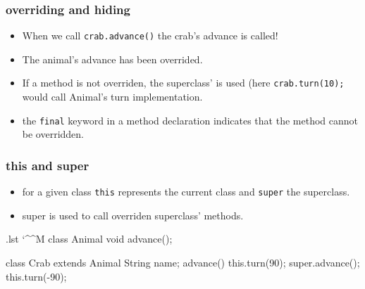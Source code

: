 \documentclass[10pt, handout]{beamer}
\makeatletter
\newenvironment{code}{%
  \begingroup
  \@bsphack
  \immediate\openout\lstvrb@out\jobname.lst
  \let\do\@makeother\dospecials\catcode`\^^M\active
  \def\verbatim@processline{%
    \immediate\write\lstvrb@out{\the\verbatim@line}}%
  \verbatim@start}{%
  \immediate\closeout\lstvrb@out
  \@esphack
  \endgroup
  
  \begin{alertblock}{}
    
  \end{alertblock}}
\makeatother
\begin{document}
\begin{frame}[fragile]
\frametitle{overriding and hiding}
\begin{itemize}
  \item When we call \verb!crab.advance()! the crab's advance is called!
  \item The animal's advance has been overrided.
  \item If a method is not overriden, the superclass' is used (here \verb!crab.turn(10);! would call Animal's turn implementation.
  \item the \alert{\verb!final!} keyword in a method declaration indicates that the method cannot be overridden.
\end{itemize}

\end{frame}

\begin{frame}
\frametitle{this and super}
  \begin{itemize}
    \item for a given class \alert{\verb!this!} represents the current class and \alert{\verb!super!} the superclass. 
    \item super is used to call overriden superclass' methods.
  \end{itemize}
  \begin{code}
class Animal {
  void advance();    
}

class Crab extends Animal{
  String name;
  advance() {
    this.turn(90);
    super.advance();
    this.turn(-90);
  }
}
\end{code}
\end{frame}
\end{document}
